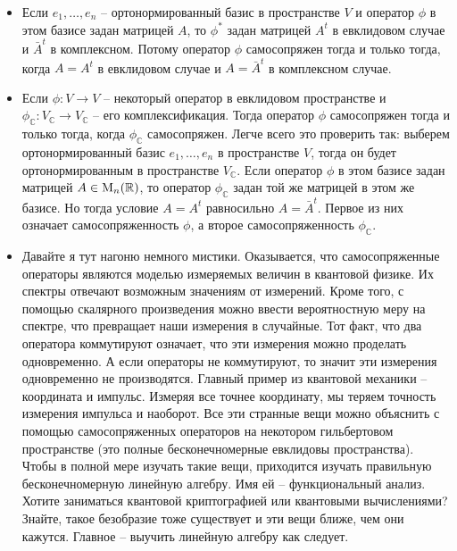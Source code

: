 \begin{itemize}
\item Если $e_1,\ldots,e_n$ -- ортонормированный базис в пространстве $V$ и оператор $\phi$ в этом базисе задан матрицей $A$, то $\phi^*$ задан матрицей $A^t$ в евклидовом случае и $\bar A^t$ в комплексном. Потому оператор $\phi$ самосопряжен тогда и только тогда, когда $A = A^t$ в евклидовом случае и $A = \bar A^t$ в комплексном случае.

\item Если $\phi\colon V\to V$ -- некоторый оператор в евклидовом пространстве и $\phi_\mathbb C\colon V_\mathbb C\to V_\mathbb C$ -- его комплексификация. Тогда оператор $\phi$ самосопряжен тогда и только тогда, когда $\phi_\mathbb C$ самосопряжен. Легче всего это проверить так: выберем ортонормированный базис $e_1,\ldots,e_n$ в пространстве $V$, тогда он будет ортонормированным в пространстве $V_\mathbb C$. Если оператор $\phi$ в этом базисе задан матрицей $A\in \operatorname{M}_{n}(\mathbb R)$, то оператор $\phi_\mathbb C$ задан той же матрицей в этом же базисе. Но тогда условие $A = A^t$ равносильно $A = \bar A^t$. Первое из них означает самосопряженность $\phi$, а второе самосопряженность $\phi_\mathbb C$.

\item Давайте я тут нагоню немного мистики. Оказывается, что самосопряженные операторы являются моделью измеряемых величин в квантовой физике. Их спектры отвечают возможным значениям от измерений. Кроме того, с помощью скалярного произведения можно ввести вероятностную меру на спектре, что превращает наши измерения в случайные. Тот факт, что два оператора коммутируют означает, что эти измерения можно проделать одновременно. А если операторы не коммутируют, то значит эти измерения одновременно не производятся. Главный пример из квантовой механики -- координата и импульс. Измеряя все точнее координату, мы теряем точность измерения импульса и наоборот. Все эти странные вещи можно объяснить с помощью самосопряженных операторов на некотором гильбертовом пространстве (это полные бесконечномерные евклидовы пространства). Чтобы в полной мере изучать такие вещи, приходится изучать правильную бесконечномерную линейную алгебру. Имя ей -- функциональный анализ. Хотите заниматься квантовой криптографией или квантовыми вычислениями? Знайте, такое безобразие тоже существует и эти вещи ближе, чем они кажутся. Главное -- выучить линейную алгебру как следует.
\end{itemize}

